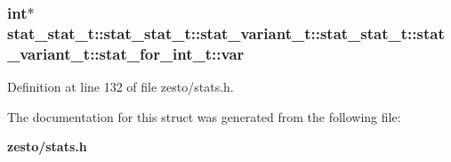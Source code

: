 \subsubsection[{var}]{\setlength{\rightskip}{0pt plus 5cm}int$\ast$ stat\_\-stat\_\-t::stat\_\-stat\_\-t::stat\_\-variant\_\-t::stat\_\-stat\_\-t::stat\_\-variant\_\-t::stat\_\-for\_\-int\_\-t::var}\label{structstat__stat__t_1_1stat__variant__t_1_1stat__for__int__t_eea64ae6b7106df10a49d291d92a83ac}




Definition at line 132 of file zesto/stats.h.

The documentation for this struct was generated from the following file:\begin{CompactItemize}
\item 
{\bf zesto/stats.h}\end{CompactItemize}
